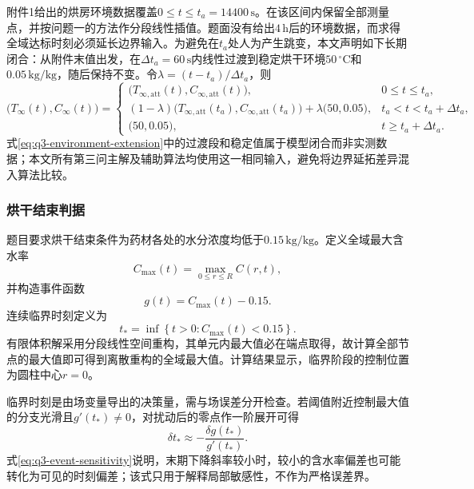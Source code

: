 \documentclass[withoutpreface,bwprint]{cumcmthesis}
\begin{document}
附件1给出的烘房环境数据覆盖$0\le t\le t_a=14400\,\mathrm{s}$。在该区间内保留全部测量点，并按问题一的方法作分段线性插值。题面没有给出$4\,\mathrm h$后的环境数据，而求得全域达标时刻必须延长边界输入。为避免在$t_a$处人为产生跳变，本文声明如下长期闭合：从附件末值出发，在$\Delta t_a=60\,\mathrm{s}$内线性过渡到稳定烘干环境$50\,{}^\circ\mathrm C$和$0.05\,\mathrm{kg/kg}$，随后保持不变。令$\lambda=(t-t_a)/\Delta t_a$，则
\begin{equation}
\bigl(T_\infty(t),C_\infty(t)\bigr)
=
\begin{cases}
\bigl(T_{\infty,\mathrm{att}}(t),C_{\infty,\mathrm{att}}(t)\bigr),
&0\le t\le t_a,\\
(1-\lambda)\bigl(T_{\infty,\mathrm{att}}(t_a),C_{\infty,\mathrm{att}}(t_a)\bigr)
+\lambda\bigl(50,0.05\bigr),
&t_a<t<t_a+\Delta t_a,\\
\bigl(50,0.05\bigr),
&t\ge t_a+\Delta t_a.
\end{cases}
\label{eq:q3-environment-extension}
\end{equation}
式\eqref{eq:q3-environment-extension}中的过渡段和稳定值属于模型闭合而非实测数据；本文所有第三问主解及辅助算法均使用这一相同输入，避免将边界延拓差异混入算法比较。

\subsubsection{烘干结束判据}

题目要求烘干结束条件为药材各处的水分浓度均低于$0.15\,\mathrm{kg/kg}$。定义全域最大含水率
\begin{equation}
C_{\max}(t)
=
\max_{0\le r\le R}C(r,t),
\label{eq:q3-global-maximum}
\end{equation}
并构造事件函数
\begin{equation}
g(t)=C_{\max}(t)-0.15.
\label{eq:q3-event-function}
\end{equation}
连续临界时刻定义为
\begin{equation}
\boxed{
t_*
=
\inf
\left\{
t>0:C_{\max}(t)<0.15
\right\}.
}
\label{eq:q3-drying-time}
\end{equation}
有限体积解采用分段线性空间重构，其单元内最大值必在端点取得，故计算全部节点的最大值即可得到离散重构的全域最大值。计算结果显示，临界阶段的控制位置为圆柱中心$r=0$。

临界时刻是由场变量导出的决策量，需与场误差分开检查。若阈值附近控制最大值的分支光滑且$g'(t_*)\ne0$，对扰动后的零点作一阶展开可得
\begin{equation}
\delta t_*
\approx-\frac{\delta g(t_*)}{g'(t_*)}.
\label{eq:q3-event-sensitivity}
\end{equation}
式\eqref{eq:q3-event-sensitivity}说明，末期下降斜率较小时，较小的含水率偏差也可能转化为可见的时刻偏差；该式只用于解释局部敏感性，不作为严格误差界。
\end{document}
